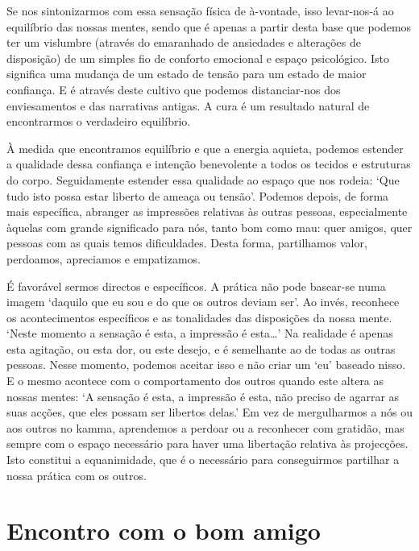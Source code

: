 Se nos sintonizarmos com essa sensação física de à-vontade, isso levar-nos-á ao equilíbrio das nossas mentes, sendo que é apenas a partir desta base que podemos ter um vislumbre (através do emaranhado de ansiedades e alterações de disposição) de um simples fio de conforto emocional e espaço psicológico. Isto significa uma mudança de um estado de tensão para um estado de maior confiança. E é através deste cultivo que podemos distanciar-nos dos enviesamentos e das narrativas antigas. A cura é um resultado natural de encontrarmos o verdadeiro equilíbrio.

À medida que encontramos equilíbrio e que a energia aquieta, podemos estender a qualidade dessa confiança e intenção benevolente a todos os tecidos e estruturas do corpo. Seguidamente estender essa qualidade ao espaço que nos rodeia: `Que tudo isto possa estar liberto de ameaça ou tensão'. Podemos depois, de forma mais específica, abranger as impressões relativas às outras pessoas, especialmente àquelas com grande significado para nós, tanto bom como mau: quer amigos, quer pessoas com as quais temos dificuldades. Desta forma, partilhamos valor, perdoamos, apreciamos e empatizamos.

É favorável sermos directos e específicos. A prática não pode basear-se numa imagem `daquilo que eu sou e do que os outros deviam ser'. Ao invés, reconhece os acontecimentos específicos e as tonalidades das disposições da nossa mente. `Neste momento a sensação é esta, a impressão é esta\ldots{}' Na realidade é apenas esta agitação, ou esta dor, ou este desejo, e é semelhante ao de todas as outras pessoas. Nesse momento, podemos aceitar isso e não criar um `eu' baseado nisso. E o mesmo acontece com o comportamento dos outros quando este altera as nossas mentes: `A sensação é esta, a impressão é esta, não preciso de agarrar as suas acções, que eles possam ser libertos delas.' Em vez de mergulharmos a nós ou aos outros no kamma, aprendemos a perdoar ou a reconhecer com gratidão, mas sempre com o espaço necessário para haver uma libertação relativa às projecções. Isto constitui a equanimidade, que é o necessário para conseguirmos partilhar a nossa prática com os outros.

\section{Encontro com o bom amigo}

